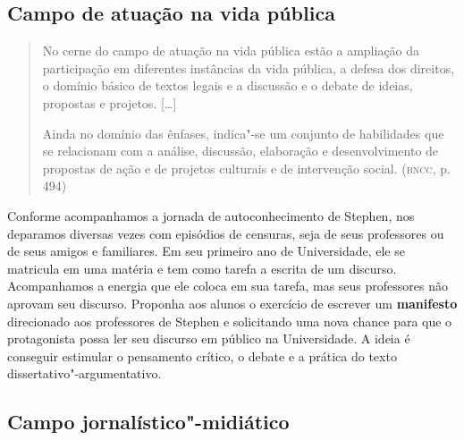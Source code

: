 \documentclass{article}
\begin{document}
\subsection{Campo de atuação na vida pública}

\begin{quote}
No cerne do campo de atuação na vida pública estão a ampliação da
participação em diferentes instâncias da vida pública, a defesa dos
direitos, o domínio básico de textos legais e a discussão e o debate de
ideias, propostas e projetos. {[}\ldots{}{]}

Ainda no domínio das ênfases, indica"-se um conjunto de habilidades que
se relacionam com a análise, discussão, elaboração e desenvolvimento de
propostas de ação e de projetos culturais e de intervenção social.
(\textsc{bncc}, p. 494)
\end{quote}

Conforme acompanhamos a jornada de autoconhecimento de Stephen, nos
deparamos diversas vezes com episódios de censuras, seja de seus
professores ou de seus amigos e familiares. Em seu primeiro ano de
Universidade, ele se matricula em uma matéria e tem como tarefa a
escrita de um discurso. Acompanhamos a energia que ele coloca em sua
tarefa, mas seus professores não aprovam seu discurso. Proponha aos
alunos o exercício de escrever um \textbf{manifesto} direcionado aos
professores de Stephen e solicitando uma nova chance para que o
protagonista possa ler seu discurso em público na Universidade. A
ideia é conseguir estimular o pensamento crítico, o debate e a prática
do texto dissertativo"-argumentativo.

\subsection{Campo jornalístico"-midiático}
\end{document}
